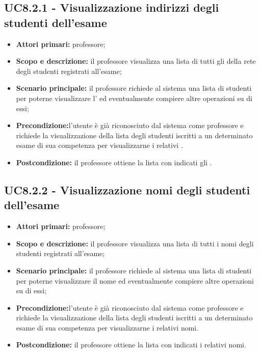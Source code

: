 \documentclass[AnalisiDeiRequisiti.tex]{subfiles}
\begin{document}
\subsection{UC8.2.1 - Visualizzazione indirizzi degli studenti dell'esame}
\begin{itemize}
	\item \textbf{Attori primari:} professore;
	\item \textbf{Scopo e descrizione:} il professore visualizza una lista di tutti gli  della rete  degli studenti registrati all'esame;
	\item \textbf{Scenario principale:} il professore richiede al sistema una lista di studenti per poterne visualizzare l' ed eventualmente compiere altre operazioni su di essi;
	\item \textbf{Precondizione:}l'utente è già riconosciuto dal sistema come professore e richiede la visualizzazione della lista degli studenti iscritti a un determinato esame di sua competenza per visualizzarne i relativi .
	\item \textbf{Postcondizione:} il professore ottiene la lista con indicati gli .
\end{itemize}
\subsection{UC8.2.2 - Visualizzazione nomi degli studenti dell'esame}
\begin{itemize}
	\item \textbf{Attori primari:} professore;
	\item \textbf{Scopo e descrizione:} il professore visualizza una lista di tutti i nomi degli studenti registrati all'esame;
	\item \textbf{Scenario principale:} il professore richiede al sistema una lista di studenti per poterne visualizzare il nome ed eventualmente compiere altre operazioni su di essi;
	\item \textbf{Precondizione:}l'utente è già riconosciuto dal sistema come professore e richiede la visualizzazione della lista degli studenti iscritti a un determinato esame di sua competenza per visualizzarne i relativi nomi.
	\item \textbf{Postcondizione:} il professore ottiene la lista con indicati i relativi nomi.
\end{itemize}
\end{document}
